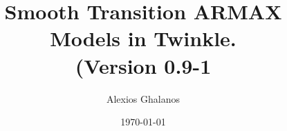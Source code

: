 \documentclass[11pt,a4paper]{article}
\begin{document}
\title{Smooth Transition ARMAX Models in Twinkle.\\
(Version 0.9-1}
\author{Alexios Ghalanos}
\date{\today}
\maketitle
\tableofcontents
\newpage

\clearpage

\end{document}
